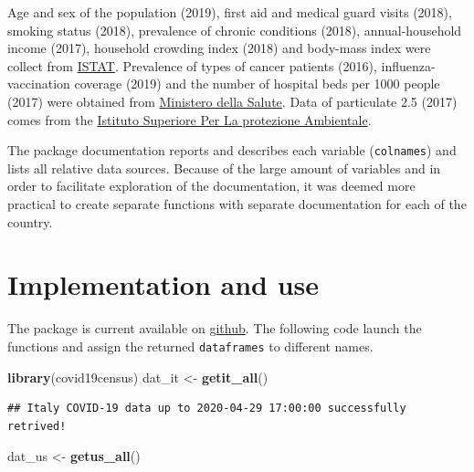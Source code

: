 \documentclass[12pt,halfline,a4paper,]{ouparticle}
\newenvironment{Shaded}{\begin{snugshade}}{\end{snugshade}}
\newcommand{\KeywordTok}[1]{\textcolor[rgb]{0.13,0.29,0.53}{\textbf{#1}}}
\newcommand{\NormalTok}[1]{#1}
\newcommand{\StringTok}[1]{\textcolor[rgb]{0.31,0.60,0.02}{#1}}
\begin{document}
Age and sex of the population (2019), first aid and medical guard visits
(2018), smoking status (2018), prevalence of chronic conditions (2018),
annual-household income (2017), household crowding index (2018) and
body-mass index were collect from
\href{http://dati.istat.it/?lang=en}{ISTAT}. Prevalence of types of
cancer patients (2016), influenza-vaccination coverage (2019) and the
number of hospital beds per 1000 people (2017) were obtained from
\href{http://www.dati.salute.gov.it/}{Ministero della Salute}. Data of
particulate 2.5 (2017) comes from the
\href{https://annuario.isprambiente.it/pon/basic/14}{Istituto Superiore
Per La protezione Ambientale}.

The package documentation reports and describes each variable
(\texttt{colnames}) and lists all relative data sources. Because of the
large amount of variables and in order to facilitate exploration of the
documentation, it was deemed more practical to create separate functions
with separate documentation for each of the country.

\hypertarget{implementation-and-use}{%
\section{Implementation and use}\label{implementation-and-use}}

The package is current available on
\href{https://github.com/c1au6i0/covid19census}{github}. The following
code launch the functions and assign the returned \texttt{dataframes} to
different names.

\bigskip

\begin{Shaded}
\begin{Highlighting}[]
\KeywordTok{library}\NormalTok{(covid19census)}
\NormalTok{dat_it <-}\StringTok{ }\KeywordTok{getit_all}\NormalTok{()}
\end{Highlighting}
\end{Shaded}

\begin{verbatim}
## Italy COVID-19 data up to 2020-04-29 17:00:00 successfully retrived!
\end{verbatim}

\begin{Shaded}
\begin{Highlighting}[]
\NormalTok{dat_us <-}\StringTok{ }\KeywordTok{getus_all}\NormalTok{()}
\end{Highlighting}
\end{Shaded}
\end{document}
